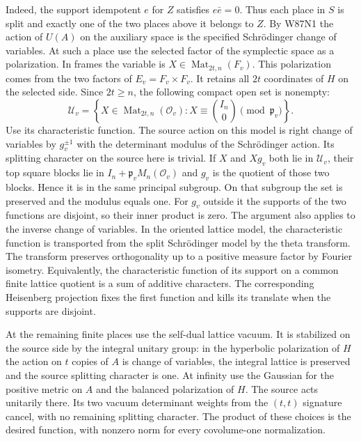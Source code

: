 Indeed, the support idempotent $e$ for $Z$ satisfies $e\bar e=0$.
Thus each place in $S$ is split and exactly one of the two places
above it belongs to $Z$. By W87N1 the action of $U(A)$ on the auxiliary
space is the specified Schr\"odinger change of variables. At such a place use the
selected factor of the symplectic space as a polarization. In frames the variable is
$X\in\operatorname{Mat}_{2t,n}(F_v)$. This polarization comes from
the two factors of $E_v=F_v\times F_v$. It retains all $2t$
coordinates of $H$ on the selected side. Since $2t\ge n$, the
following compact open set is nonempty:
\[
 \mathcal U_v=\left\{X\in\operatorname{Mat}_{2t,n}(\mathcal O_v):
 X\equiv\binom{I_n}{0}\pmod{\mathfrak p_v}\right\}.
\]
Use its characteristic function. The source action on this model
is right change of variables by $g_v^{\pm1}$ with the determinant
modulus of the Schr\"odinger action. Its splitting character on the
source here is trivial. If $X$ and $Xg_v$ both lie in $\mathcal U_v$,
their top square blocks lie in $I_n+\mathfrak p_v M_n(\mathcal O_v)$
and $g_v$ is the quotient of those two blocks. Hence it is in the
same principal subgroup. On that subgroup the set is preserved and
the modulus equals one. For $g_v$ outside it the supports of the two
functions are disjoint, so their inner product is zero. The argument
also applies to the inverse change of variables. In the oriented
lattice model, the characteristic function is transported from the
split Schr\"odinger model by the theta transform. The transform
preserves orthogonality up to a positive measure factor by Fourier
isometry. Equivalently, the characteristic function of its support
on a common finite lattice quotient is a sum of additive characters.
The corresponding Heisenberg projection fixes the first function
and kills its translate when the supports are disjoint.

At the remaining finite places use the self-dual lattice vacuum.
It is stabilized on the source side by the integral unitary group:
in the hyperbolic polarization of $H$ the action on $t$ copies of
$A$ is change of variables, the integral lattice is preserved and
the source splitting character is one. At infinity use the Gaussian
for the positive metric on $A$ and the balanced polarization of
$H$. The source acts unitarily there. Its two vacuum determinant
weights from the $(t,t)$ signature cancel, with no remaining
splitting character. The product of these choices is the desired
function, with nonzero norm for every covolume-one normalization.


